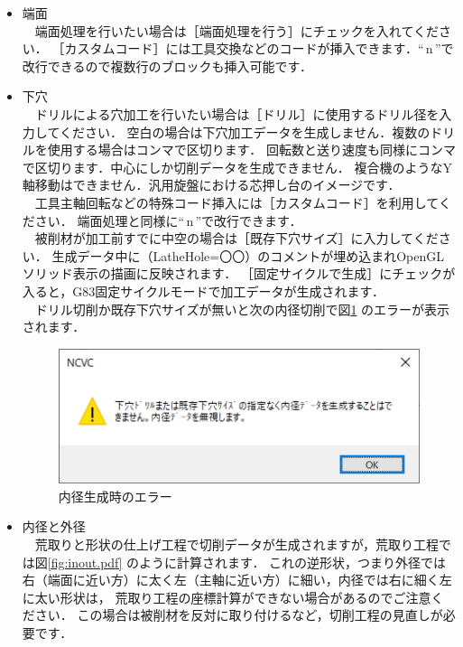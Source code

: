 \begin{itemize}
\item 端面\\
　端面処理を行いたい場合は［端面処理を行う］にチェックを入れてください．
［カスタムコード］には工具交換などのコードが挿入できます．``\,\yen{}n\,''で改行できるので複数行のブロックも挿入可能です．

\vspace*{1zh}
\item 下穴\\
　ドリルによる穴加工を行いたい場合は［ドリル］に使用するドリル径を入力してください．
空白の場合は下穴加工データを生成しません．複数のドリルを使用する場合はコンマで区切ります．
回転数と送り速度も同様にコンマで区切ります．中心にしか切削データを生成できません．
複合機のようなY軸移動はできません．汎用旋盤における芯押し台のイメージです．\\
　工具主軸回転などの特殊コード挿入には［カスタムコード］を利用してください．
端面処理と同様に``\,\yen{}n\,''で改行できます．\\
　被削材が加工前すでに中空の場合は［既存下穴サイズ］に入力してください．
生成データ中に（LatheHole=〇〇）のコメントが埋め込まれOpenGLソリッド表示の描画に反映されます．
［固定サイクルで生成］にチェックが入ると，G83固定サイクルモードで加工データが生成されます．\\
　ドリル切削か既存下穴サイズが無いと次の内径切削で図\ref{fig:error.png} のエラーが表示されます．

\begin{figure}[H]
\centering
\includegraphics[scale=0.8]{No2/fig/error.png}
\caption{内径生成時のエラー}
\label{fig:error.png}
\end{figure}

\vspace*{1zh}
\item 内径と外径\\
　荒取りと形状の仕上げ工程で切削データが生成されますが，荒取り工程では図\ref{fig:inout.pdf} のように計算されます．
これの逆形状，つまり外径では右（端面に近い方）に太く左（主軸に近い方）に細い，内径では右に細く左に太い形状は，
荒取り工程の座標計算ができない場合があるのでご注意ください．
この場合は被削材を反対に取り付けるなど，切削工程の見直しが必要です．


\end{itemize}
